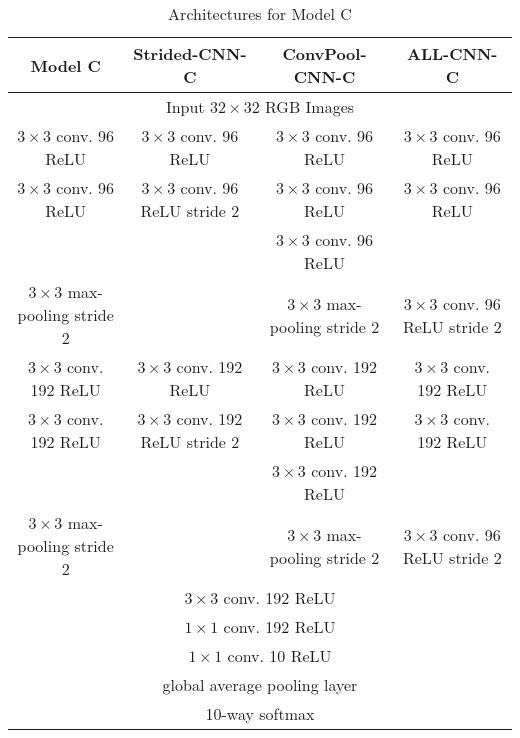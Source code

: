 \begin{table}
  \centering
  \begin{tabular}{|c|c|c|c|}
    \hline
    Model C & Strided-CNN-C & ConvPool-CNN-C & ALL-CNN-C \\
    \hline
    \multicolumn{4}{|c|}{Input $32\times32$ RGB Images} \\
    \hline
    $3\times3$ conv. 96 ReLU & $3\times3$ conv. 96 ReLU &  $3\times3$ conv. 96 ReLU & $3\times3$ conv. 96 ReLU \\
    $3\times3$ conv. 96 ReLU & $3\times3$ conv. 96 ReLU stride 2 &  $3\times3$ conv. 96 ReLU & $3\times3$ conv. 96 ReLU \\
    & & $3\times3$ conv. 96 ReLU & \\
    \hline
    $3\times3$ max-pooling stride 2 & & $3\times3$ max-pooling stride 2& $3\times3$ conv. 96 ReLU stride 2 \\
    \hline
    $3\times3$ conv. 192 ReLU & $3\times3$ conv. 192 ReLU &  $3\times3$ conv. 192 ReLU & $3\times3$ conv. 192 ReLU \\
    $3\times3$ conv. 192 ReLU & $3\times3$ conv. 192 ReLU stride 2 &  $3\times3$ conv. 192 ReLU & $3\times3$ conv. 192 ReLU \\
    & & $3\times3$ conv. 192 ReLU & \\
    \hline
    $3\times3$ max-pooling stride 2 & & $3\times3$ max-pooling stride 2& $3\times3$ conv. 96 ReLU stride 2 \\
    \hline
    \multicolumn{4}{|c|}{$3\times3$ conv. 192 ReLU} \\
    \multicolumn{4}{|c|}{$1\times1$ conv. 192 ReLU} \\
    \multicolumn{4}{|c|}{$1\times1$ conv. 10 ReLU} \\
    \multicolumn{4}{|c|}{global average pooling layer} \\
    \multicolumn{4}{|c|}{10-way softmax} \\
  \end{tabular}
  \caption{Architectures for Model C}
\end{table}

